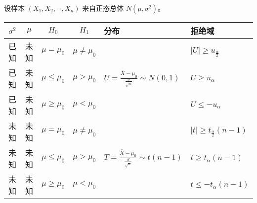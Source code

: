 \documentclass{ctexbook}
\begin{document}
\begin{proposition}[正态分布下的六大检验]
    设样本 $(X_1,X_2,\cdots,X_n)$ 来自正态总体 $N(\mu,\sigma^2)$。
    
    \noindent\begin{tabular}{ccccll}
        $\sigma^2$ & $\mu$ & $H_0$ & $H_1$ & 分布 &拒绝域 \\
        \hline
        已知 & 未知 & $\mu=\mu_0$ & $\mu\neq\mu_0$ & \multirow{3}{*}{$U=\frac{\bar{X}-\mu_0}{\frac{\sigma}{\sqrt{n}}}\sim N(0,1)$} & $|U|\geq u_{\frac{\alpha}{2}}$ \\
        已知 & 未知 & $\mu\leq\mu_0$ & $\mu>\mu_0$ & & $U\geq u_\alpha$ \\
        已知 & 未知 & $\mu\geq\mu_0$ & $\mu<\mu_0$ & & $U\leq -u_\alpha$ \\
        \hline
        未知 & 未知 & $\mu=\mu_0$ & $\mu\neq\mu_0$ & \multirow{3}{*}{$T=\frac{\bar{X}-\mu_0}{\frac{S}{\sqrt{n}}}\sim t(n-1)$} & $|t|\geq t_{\frac{\alpha}{2}}(n-1)$ \\
        未知 & 未知 & $\mu\leq\mu_0$ & $\mu>\mu_0$ & & $t\geq t_\alpha(n-1)$\\
        未知 & 未知 & $\mu\geq\mu_0$ & $\mu<\mu_0$ & & $t\leq -t_\alpha(n-1)$
    \end{tabular}
\end{proposition}

\nocite{*}


\clearpage
\begin{multicols}{2}
    \small
    \listoftheorems
\end{multicols}
\end{document}
